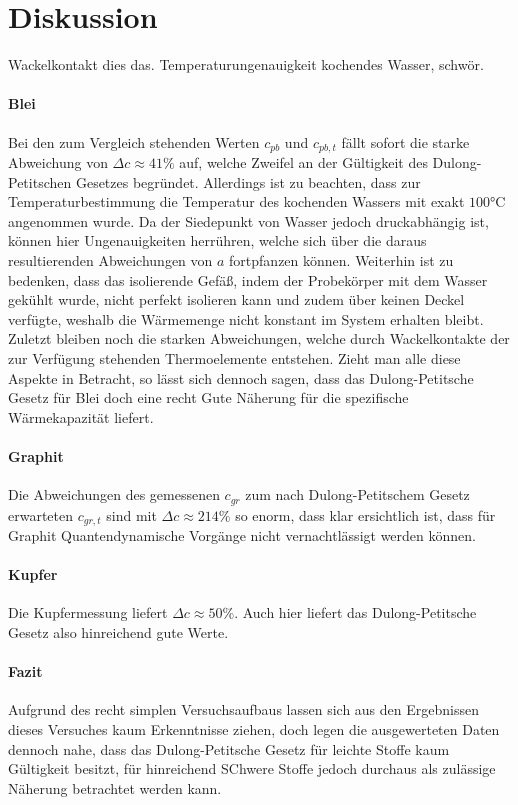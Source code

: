 \section{Diskussion}
\label{sec:Diskussion}
Wackelkontakt dies das.
Temperaturungenauigkeit kochendes Wasser, schwör.

\paragraph{Blei}

Bei den zum Vergleich stehenden Werten $c_{pb}$ und $c_{pb,t}$ fällt sofort die starke Abweichung von $\Delta c \approx 41 \%$ auf, welche Zweifel an der Gültigkeit des Dulong-Petitschen Gesetzes begründet. Allerdings ist zu beachten, dass zur Temperaturbestimmung die Temperatur des kochenden Wassers mit exakt $100 \si{\celsius}$ angenommen wurde. Da der Siedepunkt von Wasser jedoch druckabhängig ist, können hier Ungenauigkeiten herrühren, welche sich über die daraus resultierenden Abweichungen von $a$ fortpfanzen können. Weiterhin ist zu bedenken, dass das isolierende Gefäß, indem der Probekörper mit dem Wasser gekühlt wurde, nicht perfekt isolieren kann und zudem über keinen Deckel verfügte, weshalb die Wärmemenge nicht konstant im System erhalten bleibt. Zuletzt bleiben noch die starken Abweichungen, welche durch Wackelkontakte der zur Verfügung stehenden Thermoelemente entstehen.
Zieht man alle diese Aspekte in Betracht, so lässt sich dennoch sagen, dass das Dulong-Petitsche Gesetz für Blei doch eine recht Gute Näherung für die spezifische Wärmekapazität liefert.

\paragraph{Graphit}
Die Abweichungen des gemessenen $c_{gr}$ zum nach Dulong-Petitschem Gesetz erwarteten $c_{gr,t}$ sind mit $\Delta c \approx 214 \%$ so enorm, dass klar ersichtlich ist, dass für Graphit Quantendynamische Vorgänge nicht vernachtlässigt werden können.

\paragraph{Kupfer}
Die Kupfermessung liefert $\Delta c \approx 50 \%$. Auch hier liefert das Dulong-Petitsche Gesetz also hinreichend gute Werte.

\paragraph{Fazit}
Aufgrund des recht simplen Versuchsaufbaus lassen sich aus den Ergebnissen dieses Versuches kaum Erkenntnisse ziehen, doch legen die ausgewerteten Daten dennoch nahe, dass das Dulong-Petitsche Gesetz für leichte Stoffe kaum Gültigkeit besitzt, für hinreichend SChwere Stoffe jedoch durchaus als zulässige Näherung betrachtet werden kann.
